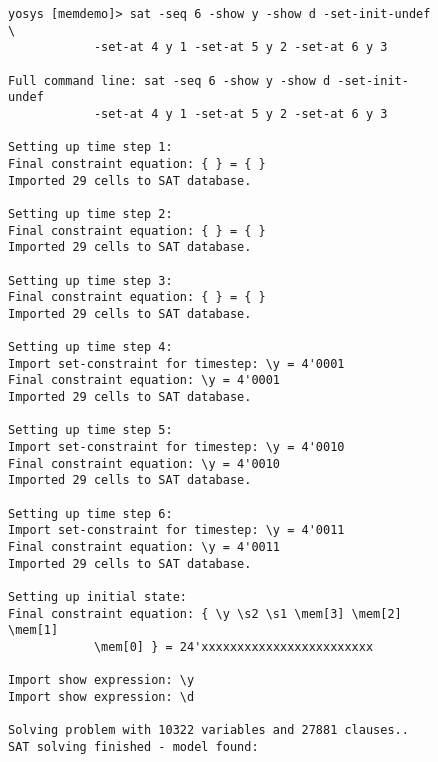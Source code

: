 \documentclass[9pt,technote,a4paper]{IEEEtran}
\begin{document}
\begin{figure}[t]
\begin{lstlisting}[basicstyle=\ttfamily\scriptsize]
yosys [memdemo]> sat -seq 6 -show y -show d -set-init-undef \
			-set-at 4 y 1 -set-at 5 y 2 -set-at 6 y 3

Full command line: sat -seq 6 -show y -show d -set-init-undef
			-set-at 4 y 1 -set-at 5 y 2 -set-at 6 y 3

Setting up time step 1:
Final constraint equation: { } = { }
Imported 29 cells to SAT database.

Setting up time step 2:
Final constraint equation: { } = { }
Imported 29 cells to SAT database.

Setting up time step 3:
Final constraint equation: { } = { }
Imported 29 cells to SAT database.

Setting up time step 4:
Import set-constraint for timestep: \y = 4'0001
Final constraint equation: \y = 4'0001
Imported 29 cells to SAT database.

Setting up time step 5:
Import set-constraint for timestep: \y = 4'0010
Final constraint equation: \y = 4'0010
Imported 29 cells to SAT database.

Setting up time step 6:
Import set-constraint for timestep: \y = 4'0011
Final constraint equation: \y = 4'0011
Imported 29 cells to SAT database.

Setting up initial state:
Final constraint equation: { \y \s2 \s1 \mem[3] \mem[2] \mem[1]
			\mem[0] } = 24'xxxxxxxxxxxxxxxxxxxxxxxx

Import show expression: \y
Import show expression: \d

Solving problem with 10322 variables and 27881 clauses..
SAT solving finished - model found:


\end{lstlisting}
\end{figure}
\end{document}
